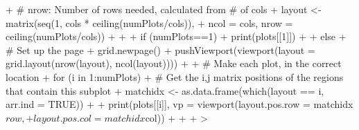 \documentclass[a4paper]{article}
\begin{document}
\begin{Schunk}
\begin{Sinput}
{{+         # nrow: Number of rows needed, calculated from # of cols
+         layout <- matrix(seq(1, cols * ceiling(numPlots/cols)),
+                          ncol = cols, nrow = ceiling(numPlots/cols))
+     }
+ 
+     if (numPlots==1) {
+         print(plots[[1]])
+ 
+     } else {
+         # Set up the page
+         grid.newpage()
+         pushViewport(viewport(layout = grid.layout(nrow(layout), ncol(layout))))
+ 
+         # Make each plot, in the correct location
+         for (i in 1:numPlots) {
+         # Get the i,j matrix positions of the regions that contain this subplot
+             matchidx <- as.data.frame(which(layout == i, arr.ind = TRUE))
+ 
+             print(plots[[i]], vp = viewport(layout.pos.row = matchidx$row,
+                                             layout.pos.col = matchidx$col))
+         }
+     }
+ }
> 
\end{Sinput}
\end{Schunk}
\end{document}

